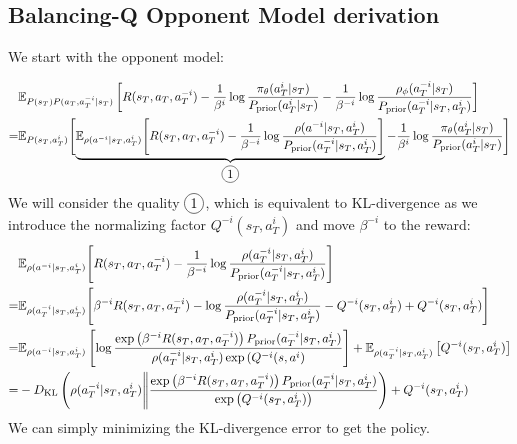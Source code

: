 \subsection{Balancing-Q Opponent Model derivation}
\label{appx:chap4-balancing-q-oppo-model}
We start with the opponent model:

\begin{equation*}
\begin{aligned}
    &\mathbb{E}_{P(s_T) P(a_T, a^{-i}_T | s_T)}\left[ R(s_T, a_T, a^{-i}_T) - \frac{1}{\beta^i} \log\frac{\pi_{\theta}(a^i_T|s_T)}{P_{\operatorname{prior}}(a^i_T|s_T)} - \frac{1}{\beta^{-i}}\log \frac{\rho_\phi(a^{-i}_T|s_T)}{P_{\operatorname{prior}}(a^{-i}_T|s_T, a^i_T)} \right]    \\
    =& \mathbb{E}_{P(s_T, a^{i}_T )} \Bigg[{\underbrace{\mathbb{E}_{\rho(a^{-i} | s_T, a^i_T)}\Bigg[R(s_T, a_T, a^{-i}_T) - \frac{1}{\beta^{-i}}\log \frac{\rho(a^{-i} | s_T, a^i_T)}{P_{\operatorname{prior}}(a^{-i}_T|s_T, a^i_T)}\Bigg]}_{\circled{1}}- \frac{1}{\beta^i} \log\frac{\pi_{\theta}(a^i_T|s_T)}{P_{\operatorname{prior}}(a^i_T|s_T)}\Bigg]} \\
\end{aligned}
\end{equation*}
We will consider the quality $\circled{1}$, which is equivalent to KL-divergence as we introduce the normalizing factor $Q^{-i}(s_T, a^{i}_T)$ and move $\beta^{-i}$ to the reward:
\begin{equation*}
\begin{aligned}
    &\mathbb{E}_{\rho(a^{-i} | s_T, a^i_T)}\Bigg[R(s_T, a_T, a^{-i}_T) - \frac{1}{\beta^{-i}}\log \frac{\rho(a^{-i}_T | s_T, a^i_T)}{P_{\operatorname{prior}}(a^{-i}_T|s_T, a^i_T)}\Bigg] \\
    =&\mathbb{E}_{\rho(a^{-i}_T | s_T, a^i_T)}\Bigg[\beta^{-i} R(s_T, a_T, a^{-i}_T) - \log \frac{\rho(a^{-i}_T | s_T, a^i_T)}{P_{\operatorname{prior}}(a^{-i}_T|s_T, a^i_T)} - Q^{-i}(s_T, a^{i}_T) + Q^{-i}(s_T, a^{i}_T)\Bigg] \\
    =&\mathbb{E}_{\rho(a^{-i} | s_T, a^i_T)}\left[ \log\frac{ \exp\left( \beta^{-i} R(s_T, a_T, a^{-i}_T) \right) P_{\text{prior}}(a^{-i}_T|s_T, a^i_T)}{\rho(a^{-i}_T | s_T, a^i_T) \exp\left( Q^{-i}(s, a^{i} \right)} \right] + \mathbb{E}_{\rho(a^{-i}_T | s_T, a^i_T)}\left[ Q^{-i}(s_T, a^{i}_T) \right] \\
    =& -D_{\mathrm{KL}}\left(  \rho(a^{-i}_T | s_T, a^i_T) \Bigg\|\frac{ \exp\left( \beta^{-i} R(s_T, a_T, a^{-i}_T) \right) P_{\text{prior}}(a^{-i}_T|s_T, a^i_T)}{\exp\left( Q^{-i}(s_T, a^{i}_T) \right)}  \right) + Q^{-i}(s_T, a^{i}_T)
\end{aligned}
\end{equation*}
We can simply minimizing the KL-divergence error to get the policy.

